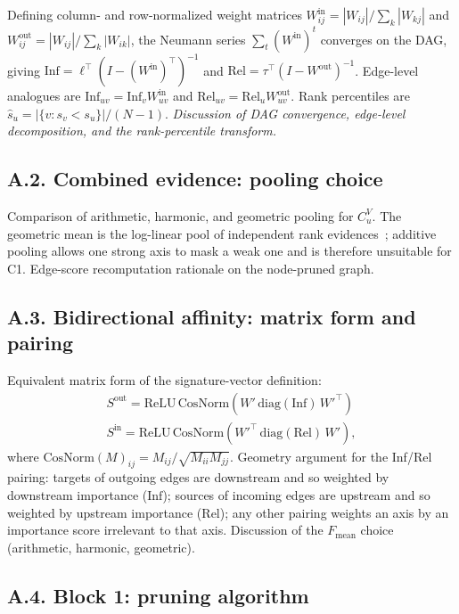 \documentclass[table, 11pt]{article}
\begin{document}
Defining column- and row-normalized weight matrices
$W^{\text{in}}_{ij} = |W_{ij}|/\sum_k |W_{kj}|$ and
$W^{\text{out}}_{ij} = |W_{ij}|/\sum_k |W_{ik}|$, the Neumann series
$\sum_t (W^{\text{in}})^t$ converges on the DAG, giving
$\text{Inf} = \ell^\top (I - (W^{\text{in}})^\top)^{-1}$ and
$\text{Rel} = \tau^\top (I - W^{\text{out}})^{-1}$. Edge-level
analogues are $\text{Inf}_{uv} = \text{Inf}_v W^{\text{in}}_{uv}$
and $\text{Rel}_{uv} = \text{Rel}_u W^{\text{out}}_{uv}$. Rank
percentiles are $\widehat{s}_u = |\{v : s_v < s_u\}|/(N-1)$.
\emph{Discussion of DAG convergence, edge-level decomposition, and
the rank-percentile transform.}

\subsection*{A.2. Combined evidence: pooling choice}\label{app:pooling}

Comparison of arithmetic, harmonic, and geometric pooling for
$C^V_u$. The geometric mean is the log-linear pool of independent
rank evidences~\cite{genest1986combining}; additive pooling allows
one strong axis to mask a weak one and is therefore unsuitable for
C1. Edge-score recomputation rationale on the node-pruned graph.

\subsection*{A.3. Bidirectional affinity: matrix form and pairing}\label{app:affinity}

Equivalent matrix form of the signature-vector definition:
\begin{align}
S^{\text{out}} = \mathrm{ReLU}\,\mathrm{CosNorm}(W' \,\mathrm{diag}(\text{Inf})\, W'^\top)\\
S^{\text{in}}  = \mathrm{ReLU}\,\mathrm{CosNorm}(W'^\top \,\mathrm{diag}(\text{Rel})\, W'),
\end{align}
where $\mathrm{CosNorm}(M)_{ij} = M_{ij}/\sqrt{M_{ii}M_{jj}}$.
Geometry argument for the Inf/Rel pairing: targets of outgoing edges
are downstream and so weighted by downstream importance ($\text{Inf}$);
sources of incoming edges are upstream and so weighted by upstream
importance ($\text{Rel}$); any other pairing weights an axis by an
importance score irrelevant to that axis. Discussion of the
$F_{\text{mean}}$ choice (arithmetic, harmonic, geometric).

\subsection*{A.4. Block 1: pruning algorithm}\label{app:block1}
\end{document}
